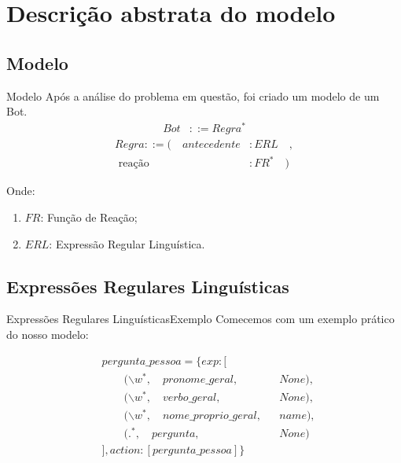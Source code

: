 \documentclass{beamer}
\begin{document}

\section{Descrição abstrata do modelo}

\subsection{Modelo}
\begin{frame}{Modelo}
\hspace{11pt} Após a análise do problema em questão, foi criado um modelo de um Bot.\\

\begin{align*}
Bot &::= Regra^* 
\end{align*}
\begin{align*}
Regra ::= ( \quad antecedente & : ERL \quad , \\
\text{ reação} & : FR^* \quad  )
\end{align*}

Onde:
\begin{enumerate}
\item $FR$: Função de Reação; \\
\item $ERL$: Expressão Regular Linguística. \\
\end{enumerate}


\end{frame}


\subsection{Expressões Regulares Linguísticas}

\begin{frame}{Expressões Regulares Linguísticas}{Exemplo}
Comecemos com um exemplo prático do nosso modelo:

\begin{align*}
&pergunta\_pessoa = \{exp: [ &&\\
&\qquad (\backslash w^*, \quad pronome\_geral, && None),\\
&\qquad (\backslash w^*, \quad verbo\_geral, && None),\\
&\qquad (\backslash w^*, \quad nome\_proprio\_geral, && name),\\
&\qquad (.^*, \quad pergunta, && None)\\
&], action: [pergunta\_pessoa] \} &&
\end{align*}

\end{frame}
\end{document}
